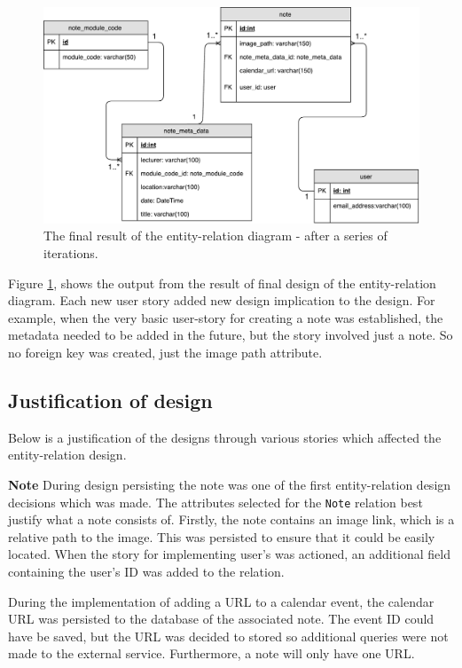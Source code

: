 \begin{figure}[H]
  \centering
  \includegraphics[scale=0.5]{images/database_diagram.pdf}
  \caption{The final result of the entity-relation diagram - after a series of iterations.}
  \label{fig:database}
\end{figure}

Figure \ref{fig:database}, shows the output from the result of final design of the entity-relation diagram. Each new user story added new design implication to the design. For example, when the very basic user-story for creating a note was established, the metadata needed to be added in the future, but the story involved just a note. So no foreign key was created, just the image path attribute.

\subsection{Justification of design}
Below is a justification of the designs through various stories which affected the entity-relation design.

\noindent
\textbf{Note}
\newline
During design persisting the note was one of the first entity-relation design decisions which was made. The attributes selected for the \texttt{Note} relation best justify what a note consists of. Firstly, the note contains an image link, which is a relative path to the image. This was persisted to ensure that it could be easily located. When the story for implementing user's was actioned, an additional field containing the user's ID was added to the relation.

During the implementation of adding a URL to a calendar event, the calendar URL was persisted to the database of the associated note. The event ID could have be saved, but the URL was decided to stored so additional queries were not made to the external service. Furthermore, a note will only have one URL.

